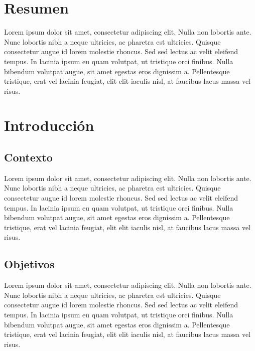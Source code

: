 \documentclass[12pt,oneside]{book}
\begin{document}
\tableofcontents
{}

\listoffigures
{}

\listoftables
{}

\chapter*{Resumen}
Lorem ipsum dolor sit amet, consectetur adipiscing elit. Nulla non lobortis ante. Nunc lobortis nibh a neque ultricies, ac pharetra est ultricies. Quisque consectetur augue id lorem molestie rhoncus. Sed sed lectus ac velit eleifend tempus. In lacinia ipsum eu quam volutpat, ut tristique orci finibus. Nulla bibendum volutpat augue, sit amet egestas eros dignissim a. Pellentesque tristique, erat vel lacinia feugiat, elit elit iaculis nisl, at faucibus lacus massa vel risus.

\chapter{Introducción}
\section{Contexto}
Lorem ipsum dolor sit amet, consectetur adipiscing elit. Nulla non lobortis ante. Nunc lobortis nibh a neque ultricies, ac pharetra est ultricies. Quisque consectetur augue id lorem molestie rhoncus. Sed sed lectus ac velit eleifend tempus. In lacinia ipsum eu quam volutpat, ut tristique orci finibus. Nulla bibendum volutpat augue, sit amet egestas eros dignissim a. Pellentesque tristique, erat vel lacinia feugiat, elit elit iaculis nisl, at faucibus lacus massa vel risus.

\section{Objetivos}
Lorem ipsum dolor sit amet, consectetur adipiscing elit. Nulla non lobortis ante. Nunc lobortis nibh a neque ultricies, ac pharetra est ultricies. Quisque consectetur augue id lorem molestie rhoncus. Sed sed lectus ac velit eleifend tempus. In lacinia ipsum eu quam volutpat, ut tristique orci finibus. Nulla bibendum volutpat augue, sit amet egestas eros dignissim a. Pellentesque tristique, erat vel lacinia feugiat, elit elit iaculis nisl, at faucibus lacus massa vel risus.
\end{document}
